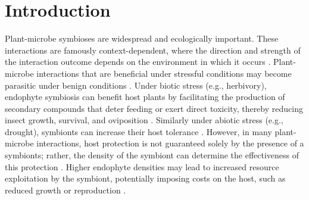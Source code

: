 \documentclass[12pt]{article}\usepackage[]{graphicx}\usepackage[dvipsnames]{xcolor}
\begin{document}
\newpage
\section*{Introduction}
Plant-microbe symbioses are widespread and ecologically important. 
These interactions are famously context-dependent, where the direction and strength of the interaction outcome depends on the environment in which it occurs \citep{fowler2023geographic,hoeksema2015context, bronstein1994conditional}.
Plant-microbe  interactions that are beneficial under stressful conditions  may become parasitic under benign conditions \citep{giauque2019endophyte}.
Under biotic stress (e.g., herbivory), endophyte symbiosis can benefit host plants by facilitating the production of secondary compounds that deter feeding or exert direct toxicity, thereby reducing insect growth, survival, and oviposition \citep{atala2022fungal,bastias2017epichloe,vega2008insect}.
Similarly under abiotic stress (e.g., drought), symbionts can increase their host tolerance  \citep{clay2002evolutionary}.
However, in many plant-microbe interactions, host protection is not guaranteed solely by the presence of a symbionts; rather, the density of the symbiont can determine the effectiveness of this protection \citep{laughton2014combined}. 
Higher endophyte densities may lead to increased resource exploitation by the symbiont, potentially imposing costs on the host, such as reduced growth or reproduction \citep{faeth2009asexual}.
\end{document}
